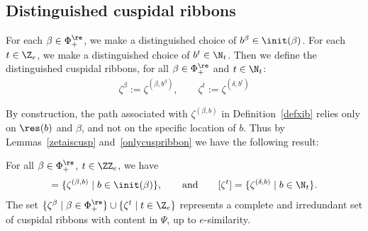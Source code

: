 \subsection{Distinguished cuspidal ribbons}
For each \(\beta \in \Phi_+^\re\), we make a distinguished choice of \(b^\beta \in \init(\beta)\). For each \(t \in \Z_e\), we make a distinguished choice of \(b^t \in \N_t\). Then we define the distinguished cuspidal ribbons, for all \(\beta \in \Phi_+^\re\) and \(t \in \N_t\):
\begin{align*}
\zeta^\beta := \zeta^{(\beta, b^{\beta})}, \qquad \zeta^t := \zeta^{(\delta, b^t)}
\end{align*}

By construction, the path associated with \(\zeta^{(\beta, b)}\) in Definition~\ref{defxib} relies only on \(\res(b)\) and \(\beta\), and not on the specific location of \(b\). Thus by Lemmas~\ref{zetaiscusp} and~\ref{onlycuspribbon} we have the following result:

\begin{prop}\label{allcusprib}
For all \(\beta \in \Phi_+^\re\), \(t \in \ZZ_e\), we have
\begin{align*}
[\zeta^{\beta}] = \{\zeta^{(\beta,b)} \mid b \in \init(\beta)\},
\qquad
\textup{and}
\qquad
[\zeta^{t}] = \{\zeta^{(\delta,b)} \mid b \in \N_t\}.
\end{align*}
The set \(\{\zeta^{\beta} \mid \beta \in \Phi_+^\re\} \cup \{\zeta^t \mid t \in \Z_e\}\) represents a complete and irredundant set of cuspidal ribbons with content in \(\Psi\), up to \(e\)-similarity.
\end{prop}
